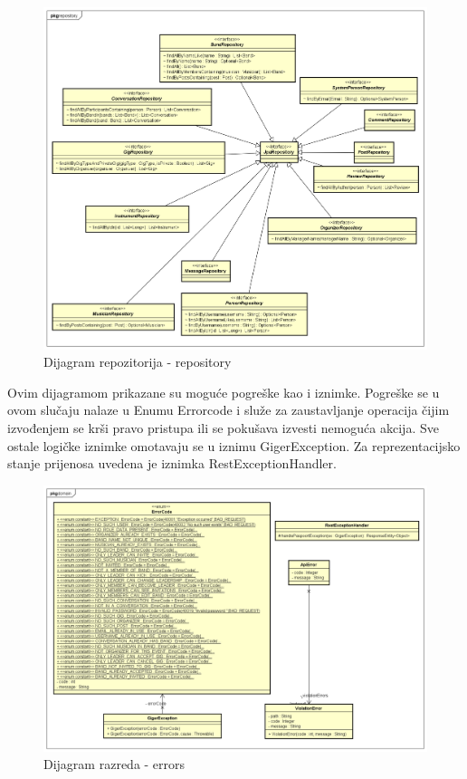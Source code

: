 		\begin{figure}[H]
			\begin{center}
				\includegraphics[width=17cm]{slike/repository1.PNG}
			\end{center}
			\caption{Dijagram repozitorija - repository}
			\label{fig:repository}
		\end{figure}
	
	Ovim dijagramom prikazane su moguće pogreške kao i iznimke. Pogreške se u ovom slučaju nalaze u Enumu Errorcode i služe za zaustavljanje operacija čijim izvođenjem se krši pravo pristupa ili se pokušava izvesti nemoguća akcija. Sve ostale logičke iznimke omotavaju se u iznimu GigerException. Za reprezentacijsko stanje prijenosa uvedena je iznimka RestExceptionHandler.
		
		\begin{figure}[H]
			\begin{center}
				\includegraphics[width=17cm]{slike/errors1.PNG}
			\end{center}
			\caption{Dijagram razreda - errors}
			\label{fig:err}
		\end{figure}
	

